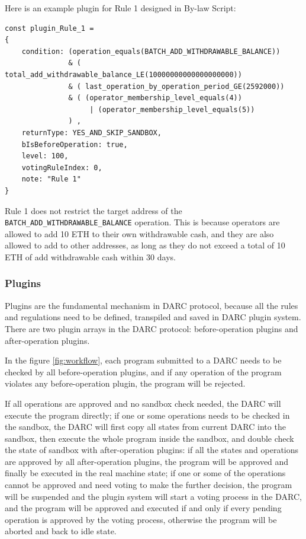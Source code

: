 \documentclass[main.tex]{subfiles}
\begin{document}
Here is an example plugin for Rule 1 designed in By-law Script:

\begin{verbatim}
const plugin_Rule_1 = 
{
    condition: (operation_equals(BATCH_ADD_WITHDRAWABLE_BALANCE))
               & ( total_add_withdrawable_balance_LE(10000000000000000000))
               & ( last_operation_by_operation_period_GE(2592000)) 
               & ( (operator_membership_level_equals(4)) 
                    | (operator_membership_level_equals(5)) 
               ) ,
    returnType: YES_AND_SKIP_SANDBOX,
    bIsBeforeOperation: true,
    level: 100,
    votingRuleIndex: 0,
    note: "Rule 1"
}
\end{verbatim}

Rule 1 does not restrict the target address of the \texttt{BATCH\_ADD\_WITHDRAWABLE\_BALANCE} operation. This is because operators are allowed to add 10 ETH to their own withdrawable cash, and they are also allowed to add to other addresses, as long as they do not exceed a total of 10 ETH of add withdrawable cash within 30 days.

\subsubsection{Plugins}

Plugins are the fundamental mechanism in DARC protocol, because all the rules and regulations need to be defined, transpiled and saved in DARC plugin system. There are two plugin arrays in the DARC protocol: before-operation plugins and after-operation plugins.


In the figure \ref{fig:workflow}, each program submitted to a DARC needs to be checked by all before-operation plugins, and if any operation of the program violates any before-operation plugin, the program will be rejected. 

If all operations are approved and no sandbox check needed, the DARC will execute the program directly; if one or some operations needs to be checked in the sandbox, the DARC will first copy all states from current DARC into the sandbox, then execute the whole program inside the sandbox, and double check the state of sandbox with after-operation plugins: if all the states and operations are approved by all after-operation plugins, the program will be approved and finally be executed in the real machine state; if one or some of the operations cannot be approved and need voting to make the further decision, the program will be suspended and the plugin system will start a voting process in the DARC, and the program will be approved and executed if and only if every pending operation is approved by the voting process, otherwise the program will be aborted and back to idle state.
\end{document}
